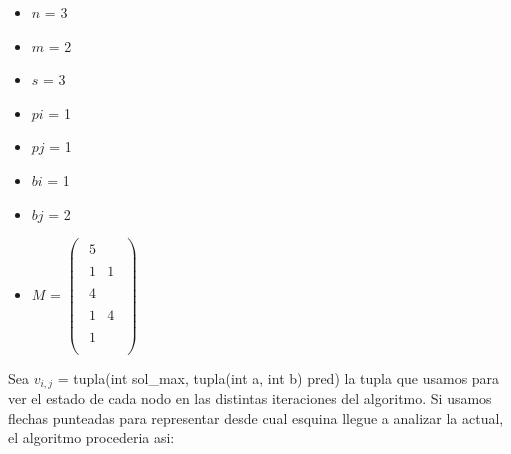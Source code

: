 \medskip
\begin{multicols}{3}
  \begin{itemize}[]
      \item $n$ = 3
      \item $m$ = 2
      \item $s$ = 3
    \end{itemize}
\columnbreak
  \begin{itemize}[]
      \item $pi$ = 1
      \item $pj$ = 1
      \item $bi$ = 1
      \item $bj$ = 2
    \end{itemize}
\columnbreak
  \begin{itemize}[]
      \item $M$ =
        $
        \begin{pmatrix}
        \begin{matrix} 5 \end{matrix}\\
        \begin{matrix} 1 & 1 \end{matrix}\\
        \begin{matrix} 4 \end{matrix}\\
        \begin{matrix} 1 & 4 \end{matrix}\\
        \begin{matrix} 1 \end{matrix}\\
        \end{pmatrix}
        $
    \end{itemize}
\end{multicols}
\medskip

Sea $v_{i,j}$ = tupla(int sol_max, tupla(int a, int b) pred) la tupla que usamos para ver el estado de cada nodo en las distintas iteraciones del algoritmo.
Si usamos flechas punteadas para representar desde cual esquina llegue a analizar la actual, el algoritmo procederia asi:

\medskip


\newarray\data
{}%

